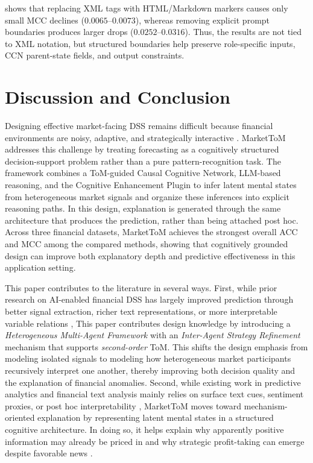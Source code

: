 \documentclass[a4paper,fleqn,doubleblind]{cas-sc}
\begin{document}
{ shows that replacing XML tags with HTML/Markdown markers causes only small MCC declines ($0.0065$--$0.0073$), whereas removing explicit prompt boundaries produces larger drops ($0.0252$--$0.0316$). Thus, the results are not tied to XML notation, but structured boundaries help preserve role-specific inputs, CCN parent-state fields, and output constraints.
}


\section{Discussion and Conclusion}\label{sec:conclusion}
Designing effective market-facing DSS remains difficult because financial environments are noisy, adaptive, and strategically interactive \citep{du2024explainable, liu2024multimodal}. MarketToM addresses this challenge by treating forecasting as a cognitively structured decision-support problem rather than a pure pattern-recognition task. The framework combines a ToM-guided Causal Cognitive Network, LLM-based reasoning, and the Cognitive Enhancement Plugin to infer latent mental states from heterogeneous market signals and organize these inferences into explicit reasoning paths. In this design, explanation is generated through the same architecture that produces the prediction, rather than being attached post hoc. Across three financial datasets, MarketToM achieves the strongest overall ACC and MCC among the compared methods, showing that cognitively grounded design can improve both explanatory depth and predictive effectiveness in this application setting.

This paper contributes to the literature in several ways. First, while prior research on AI-enabled financial DSS has largely improved prediction through better signal extraction, richer text representations, or more interpretable variable relations \citep{du2023incorporating, li2024causalstock}, This paper contributes design knowledge by introducing a \textit{Heterogeneous Multi-Agent Framework} with an \textit{Inter-Agent Strategy Refinement} mechanism that supports \textit{second-order} ToM. This shifts the design emphasis from modeling isolated signals to modeling how heterogeneous market participants recursively interpret one another, thereby improving both decision quality and the explanation of financial anomalies. Second, while existing work in predictive analytics and financial text analysis mainly relies on surface text cues, sentiment proxies, or post hoc interpretability \citep{Tetlock2007, fernandez2022explaining}, MarketToM moves toward mechanism-oriented explanation by representing latent mental states in a structured cognitive architecture. In doing so, it helps explain why apparently positive information may already be priced in and why strategic profit-taking can emerge despite favorable news \citep{peterson2002rumor, schmidt2020rumor}. 
\end{document}
